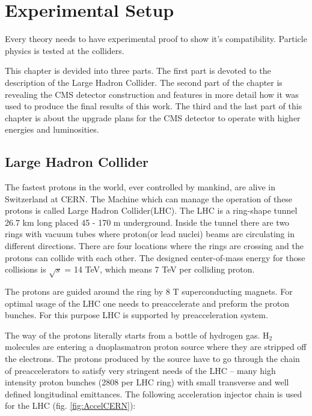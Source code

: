 \chapter{Experimental Setup}\label{chap:exp_setup}
Every theory needs to have experimental proof to show it's compatibility. Particle physics is tested at
the colliders.

This chapter is devided into three parts.
The first part is devoted to the description of the Large Hadron Collider. The second part of the 
chapter is revealing the CMS detector construction and features in more detail how it was used to produce the final
results of this work. The third and the last part of this chapter is about the upgrade plans for the
CMS detector to operate with higher energies and luminosities.

\section{Large Hadron Collider}\label{sec:LHC}

The fastest protons in the world, ever controlled by mankind, are alive in Switzerland at CERN.
The Machine which can manage the operation of these protons is called Large Hadron Collider(LHC). 
The LHC is a ring-shape tunnel 26.7 km long  placed 45 - 170 m underground. 
Inside the tunnel there are two rings with vacuum tubes where proton(or lead nuclei) beams are circulating in different directions.
There are four locations where the rings are crossing and the protons can collide with each other. 
The designed center-of-mass energy for those collisions is $\sqrt{s}$ = 14 TeV, which means 7 TeV per colliding proton.

The protons are guided around the ring by 8 T superconducting magnets. 
For optimal usage of the LHC one needs to preaccelerate and preform the proton bunches.
For this purpose LHC is supported by preacceleration system.


The way of the protons literally starts from a bottle of hydrogen gas.
H$_{2}$ molecules are entering a duoplasmatron proton source\cite{Scrivens:1382102} where they are stripped off the electrons. 
The protons produced by the source have to go through the chain of preaccelerators to satisfy very stringent needs of the LHC -- 
many high intensity proton bunches (2808 per LHC ring) with small transverse and well defined longitudinal emittances.
The following acceleration injector chain is used for the LHC (fig. \ref{fig:AccelCERN}): 

